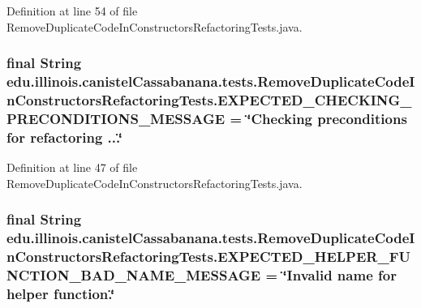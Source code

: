 Definition at line 54 of file RemoveDuplicateCodeInConstructorsRefactoringTests.java.

\hypertarget{classedu_1_1illinois_1_1canistelCassabanana_1_1tests_1_1RemoveDuplicateCodeInConstructorsRefactoringTests_a734c5cd6b9cd1e88c2ab61ae597d66a8}{
\subsubsection[{EXPECTED\_\-CHECKING\_\-PRECONDITIONS\_\-MESSAGE}]{\setlength{\rightskip}{0pt plus 5cm}final String {\bf edu.illinois.canistelCassabanana.tests.RemoveDuplicateCodeInConstructorsRefactoringTests.EXPECTED\_\-CHECKING\_\-PRECONDITIONS\_\-MESSAGE} = \char`\"{}Checking preconditions for refactoring ...\char`\"{}}}
\label{classedu_1_1illinois_1_1canistelCassabanana_1_1tests_1_1RemoveDuplicateCodeInConstructorsRefactoringTests_a734c5cd6b9cd1e88c2ab61ae597d66a8}


Definition at line 47 of file RemoveDuplicateCodeInConstructorsRefactoringTests.java.

\hypertarget{classedu_1_1illinois_1_1canistelCassabanana_1_1tests_1_1RemoveDuplicateCodeInConstructorsRefactoringTests_abf64483c95692832bdde45b66128aff9}{
\subsubsection[{EXPECTED\_\-HELPER\_\-FUNCTION\_\-BAD\_\-NAME\_\-MESSAGE}]{\setlength{\rightskip}{0pt plus 5cm}final String {\bf edu.illinois.canistelCassabanana.tests.RemoveDuplicateCodeInConstructorsRefactoringTests.EXPECTED\_\-HELPER\_\-FUNCTION\_\-BAD\_\-NAME\_\-MESSAGE} = \char`\"{}Invalid name for helper function.\char`\"{}}}
\label{classedu_1_1illinois_1_1canistelCassabanana_1_1tests_1_1RemoveDuplicateCodeInConstructorsRefactoringTests_abf64483c95692832bdde45b66128aff9}


